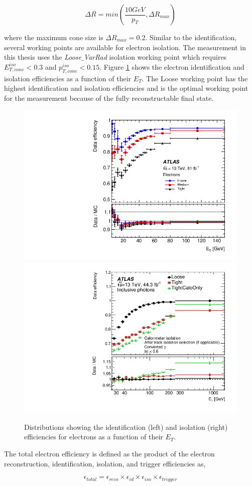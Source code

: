 \begin{equation}
\Delta R = min \left( \frac{10 GeV}{p_{T}},\Delta R_{max} \right)
\end{equation}

where the maximum cone size is $\Delta R_{max} = 0.2$. Similar to the identification, several working points are available for electron isolation. The measurement in this thesis uses the \textit{Loose$\_$VarRad} isolation working point which requires $E_{T,cone}^{iso} < 0.3$ and $p_{T,cone}^{iso} < 0.15$. Figure \ref{fig:ElecEff} shows the electron identification and isolation efficiencies as a function of their $E_{T}$. The Loose working point has the highest identification and isolation efficiencies and is the optimal working point for the measurement because of the fully reconstructable final state.

\begin{figure}
    \centering
    \includegraphics[width=.49\linewidth]{figures/LHC/ElecIdent_Eff.png}
    \includegraphics[width=.49\linewidth]{figures/LHC/Elec_IsoEff.png}
    \caption{ Distributions showing the identification (left) and isolation (right) efficiencies for electrons as a function of their $E_{T}$\cite{ElectronReco}.\label{fig:ElecEff}}
\end{figure}

The total electron efficiency is defined as the product of the electron reconstruction, identification, isolation, and trigger efficiencies as, 

\begin{equation}
    \epsilon_{total} = \epsilon_{reco} \times \epsilon_{id} \times \epsilon_{iso} \times \epsilon_{trigger}     
\end{equation}

